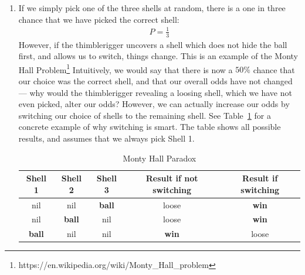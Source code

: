 \documentclass[a4paper,11pt]{article}
\author{\authorinfotitle}
\title{\titleinfo}
\date{\today}
\begin{document}
	\maketitle
	\begin{enumerate}
		\item[\textbf{1.}]
			If we simply pick one of the three shells at random, there
			is a one in three chance that we have picked the correct
			shell:
			\begin{align*}
				P = \frac{1}{3}
			\end{align*}
			However, if the thimblerigger uncovers a shell which does
			not hide the ball first, and allows us to switch, things
			change. This is an example of the Monty Hall Problem\footnote{https://en.wikipedia.org/wiki/Monty_Hall_problem}
			Intuitively, we would say that there is now a $50\%$ chance that
			our choice was the correct shell, and that our overall odds have
			not changed --- why would the thimblerigger revealing a loosing
			shell, which we have not even picked, alter our odds?
			However, we can actually increase our odds by switching
			our choice of shells to the remaining shell.
			See Table~\ref{table_monty_hall} for a concrete example
			of why switching is smart. The table shows all possible
			results, and assumes that we always pick Shell 1.

			\begin{table}[H]
			\centering
			\caption{Monty Hall Paradox}
			\begin{tabular}{| c | c | c | c | c |}
				\hline
				\textbf{Shell 1} & \textbf{Shell 2} & \textbf{Shell 3} & \textbf{Result if not switching} & \textbf{Result if switching} \\
				\hline
				nil & nil & \textbf{ball} & loose & \textbf{win} \\
				nil & \textbf{ball} & nil & loose & \textbf{win} \\
				\textbf{ball} & nil & nil & \textbf{win} & loose \\
				\hline
			\end{tabular}
			\label{table_monty_hall}
			\end{table}


\end{enumerate}
\end{document}
